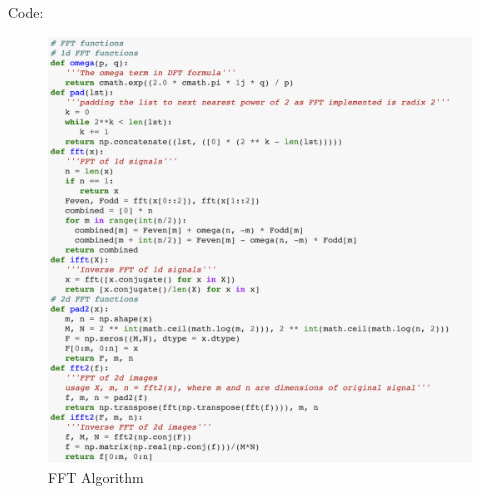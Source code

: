 \documentclass[12pt]{article}
\begin{document}
\begin{flushleft} 
Code: 
\end{flushleft}
\begin{figure}[H]
    \centering
    \includegraphics[width=1\textwidth]{fft_algo.png}
    \caption{FFT Algorithm}
\end{figure}
\end{document}
